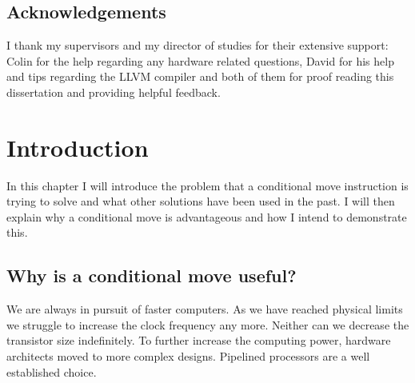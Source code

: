 \documentclass[12pt,twoside,notitlepage]{report}
\begin{document}
\bigskip
\bigskip
\bigskip
\bigskip

\leftline{\rule{6cm}{0.5pt}}

\bigskip
\bigskip
\bigskip
\bigskip

\leftline{\rule{4cm}{0.5pt}}

\cleardoublepage
\setcounter{tocdepth}{1}
\tableofcontents

\listoffigures

\listoftables

\lstlistoflistings

\newpage
\section*{Acknowledgements}

I thank my supervisors and my director of studies for their extensive support: Colin for the help regarding any hardware related questions, David for his help and tips regarding the LLVM compiler and both of them for proof reading this dissertation and providing helpful feedback. 


\cleardoublepage        %

\setcounter{page}{1}
\pagestyle{headings}

\chapter{Introduction}

In this chapter I will introduce the problem that a conditional move instruction is trying to solve and what other solutions have been used in the past. I will then explain why a conditional move is advantageous and how I intend to demonstrate this.

\section{Why is a conditional move useful?}

We are always in pursuit of faster computers. As we have reached physical limits we struggle to increase the clock frequency any more. Neither can we decrease the transistor size indefinitely. To further increase the computing power, hardware architects moved to more complex designs. Pipelined processors are a well established choice.
\end{document}
